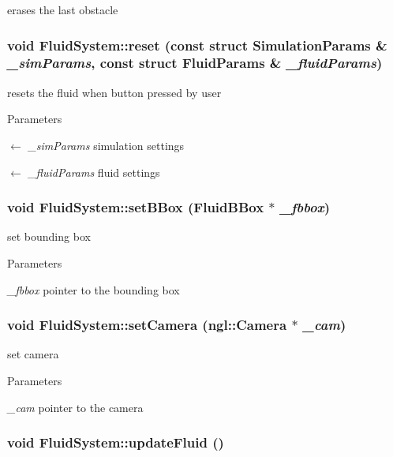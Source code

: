 erases the last obstacle \hypertarget{classFluidSystem_afbae2beaf10484816f73ca0d0c9fb754}{
\subsubsection[{reset}]{\setlength{\rightskip}{0pt plus 5cm}void FluidSystem::reset (const struct {\bf SimulationParams} \& {\em \_\-simParams}, \/  const struct {\bf FluidParams} \& {\em \_\-fluidParams})}}
\label{classFluidSystem_afbae2beaf10484816f73ca0d0c9fb754}


resets the fluid when button pressed by user 
\begin{DoxyParams}{Parameters}
\item[\mbox{$\leftarrow$} {\em \_\-simParams}]simulation settings \item[\mbox{$\leftarrow$} {\em \_\-fluidParams}]fluid settings \end{DoxyParams}
\hypertarget{classFluidSystem_af1282b7bea50c3f1ff1c6173bd430002}{
\subsubsection[{setBBox}]{\setlength{\rightskip}{0pt plus 5cm}void FluidSystem::setBBox ({\bf FluidBBox} $\ast$ {\em \_\-fbbox})}}
\label{classFluidSystem_af1282b7bea50c3f1ff1c6173bd430002}


set bounding box 
\begin{DoxyParams}{Parameters}
\item[{\em \_\-fbbox}]pointer to the bounding box \end{DoxyParams}
\hypertarget{classFluidSystem_a2301443220f5e3366016679325cbef9e}{
\subsubsection[{setCamera}]{\setlength{\rightskip}{0pt plus 5cm}void FluidSystem::setCamera (ngl::Camera $\ast$ {\em \_\-cam})}}
\label{classFluidSystem_a2301443220f5e3366016679325cbef9e}


set camera 
\begin{DoxyParams}{Parameters}
\item[{\em \_\-cam}]pointer to the camera \end{DoxyParams}
\hypertarget{classFluidSystem_a4f66756bd2842641f935acb32f14b137}{
\subsubsection[{updateFluid}]{\setlength{\rightskip}{0pt plus 5cm}void FluidSystem::updateFluid ()}}
\label{classFluidSystem_a4f66756bd2842641f935acb32f14b137}


